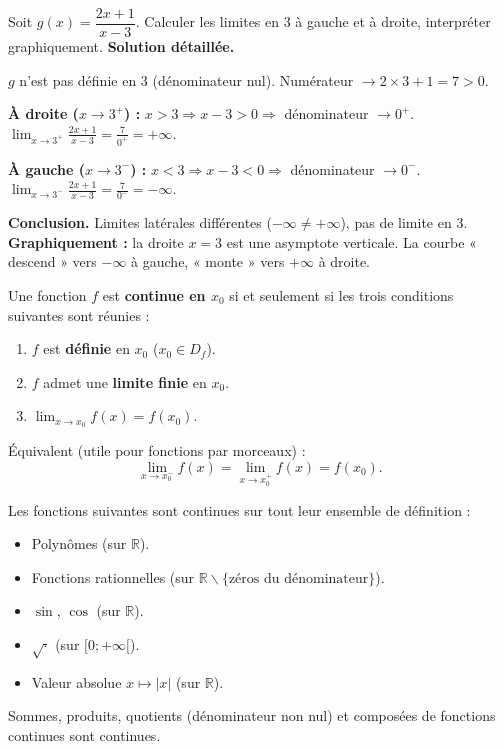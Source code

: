 \documentclass[11pt]{article}
\newcommand{\cle}[1]{{\popxbold\color{popdark}#1}}
\newcounter{popsec}
\newcounter{popsub}
\newcommand{\courssub}[1]{%
  \stepcounter{popsub}%
  \par\vspace{9pt}\noindent{\popxbold\fontsize{11.5}{13}\selectfont\color{popink}{\color{poporange}\thepopsec.\thepopsub}\hspace{6pt}#1}\par\nopagebreak\vspace{4pt}
}
\def\setminus{\mathbin{\backslash}}\let\smallsetminus\setminus
\begin{document}
\begin{exoresolu}
Soit $g(x)=\dfrac{2x+1}{x-3}$. Calculer les limites en $3$ à gauche et à droite, interpréter graphiquement.
\tcblower
\textbf{Solution détaillée.}

$g$ n'est pas définie en $3$ (dénominateur nul). Numérateur $\to 2\times 3+1=7>0$.

\textbf{À droite ($x\to 3^+$) :} $x>3 \Rightarrow x-3>0 \Rightarrow$ dénominateur $\to 0^+$.
$\displaystyle\lim_{x\to 3^+}\frac{2x+1}{x-3}=\frac{7}{0^+}=+\infty.$

\textbf{À gauche ($x\to 3^-$) :} $x<3 \Rightarrow x-3<0 \Rightarrow$ dénominateur $\to 0^-$.
$\displaystyle\lim_{x\to 3^-}\frac{2x+1}{x-3}=\frac{7}{0^-}=-\infty.$

\textbf{Conclusion.} Limites latérales différentes ($-\infty\neq+\infty$), pas de limite en $3$.
\textbf{Graphiquement :} la droite $x=3$ est une \cle{asymptote verticale}. La courbe « descend » vers $-\infty$ à gauche, « monte » vers $+\infty$ à droite.
\end{exoresolu}

\courssub{Continuité en un point}

\begin{definition}
Une fonction $f$ est \textbf{continue en $x_0$} si et seulement si les trois conditions suivantes sont réunies :
\begin{enumerate}
\item $f$ est \textbf{définie} en $x_0$ ($x_0 \in D_f$).
\item $f$ admet une \textbf{limite finie} en $x_0$.
\item $\displaystyle\lim_{x\to x_0} f(x) = f(x_0)$.
\end{enumerate}
Équivalent (utile pour fonctions par morceaux) :
\[\lim_{x\to x_0^-} f(x) = \lim_{x\to x_0^+} f(x) = f(x_0).\]
\end{definition}

\begin{propriete}
Les fonctions suivantes sont continues sur tout leur ensemble de définition :
\begin{itemize}
\item Polynômes (sur $\mathbb{R}$).
\item Fonctions rationnelles (sur $\mathbb{R}\setminus\{\text{zéros du dénominateur}\}$).
\item $\sin$, $\cos$ (sur $\mathbb{R}$).
\item $\sqrt{\cdot}$ (sur $[0;+\infty[$).
\item Valeur absolue $x\mapsto |x|$ (sur $\mathbb{R}$).
\end{itemize}
Sommes, produits, quotients (dénominateur non nul) et composées de fonctions continues sont continues.
\end{propriete}
\end{document}
